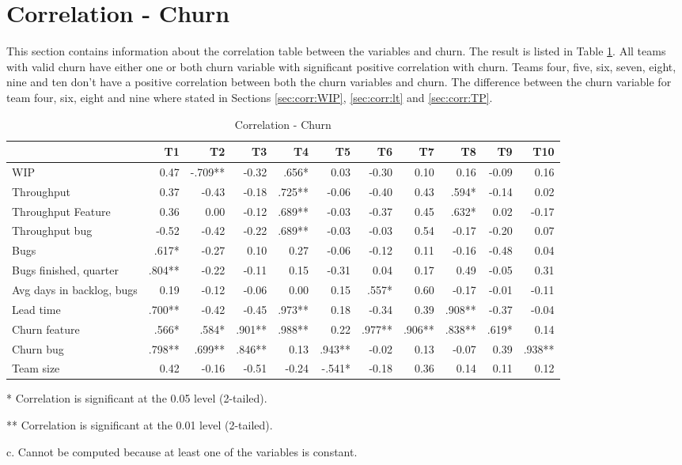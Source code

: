 \documentclass[UKenglish]{ifimaster}  %
\begin{document}
\section{Correlation - Churn}
\label{sec:corr:churn}
This section contains information about the correlation table between the variables and churn. The result is listed in Table \ref{corr:churn}.  All teams with valid churn have either one or both churn variable with significant positive correlation with churn. Teams four, five, six, seven, eight, nine and ten don't have a positive correlation between both the churn variables and churn. The difference between the churn variable for team four, six, eight and nine where stated in Sections \ref{sec:corr:WIP}, \ref{sec:corr:lt} and \ref{sec:corr:TP}.

\begin{table}[!htbp]
 \begin{adjustwidth}{-2.5cm}{}
 \centering
 \begin{tabular}{|l|r|r|r|r|r|r|r|r|r|r|}
\hline
 & \bf{T1} & \bf{T2} & \bf{T3} & \bf{T4} & \bf{T5} & \bf{T6} & \bf{T7} & \bf{T8} & \bf{T9} & \bf{T10}\\ \hline
WIP &0.47& -.709**& -0.32& .656*& 0.03& -0.30& 0.10& 0.16& -0.09& 0.16\\ \hline
Throughput &0.37& -0.43& -0.18& .725**& -0.06& -0.40& 0.43& .594*& -0.14& 0.02\\ \hline
Throughput Feature &0.36& 0.00& -0.12& .689**& -0.03& -0.37& 0.45& .632*& 0.02& -0.17\\ \hline
Throughput bug &-0.52& -0.42& -0.22& .689**& -0.03& -0.03& 0.54& -0.17& -0.20& 0.07\\ \hline
Bugs &.617*& -0.27& 0.10& 0.27& -0.06& -0.12& 0.11& -0.16& -0.48& 0.04\\ \hline
Bugs finished, quarter &.804**& -0.22& -0.11& 0.15& -0.31& 0.04& 0.17& 0.49& -0.05& 0.31\\ \hline
Avg days in backlog, bugs &0.19& -0.12& -0.06& 0.00& 0.15& .557*& 0.60& -0.17& -0.01& -0.11\\ \hline
Lead time &.700**& -0.42& -0.45& .973**& 0.18& -0.34& 0.39& .908**& -0.37& -0.04\\ \hline
Churn feature &.566*& .584*& .901**& .988**& 0.22& .977**& .906**& .838**& .619*& 0.14\\ \hline
Churn bug &.798**& .699**& .846**& 0.13& .943**& -0.02& 0.13& -0.07& 0.39& .938**\\ \hline
Team size &0.42& -0.16& -0.51& -0.24& -.541*
& -0.18& 0.36& 0.14& 0.11& 0.12\\ \hline
\end{tabular}
 \caption{Correlation - Churn}
 \label{corr:churn}
 \centerline {* Correlation is significant at the 0.05 level (2-tailed).}
\centerline{** Correlation is significant at the 0.01 level (2-tailed).}
\centerline{c. Cannot be computed because at least one of the variables is constant.}
\end{adjustwidth}
\end{table}
\end{document}
